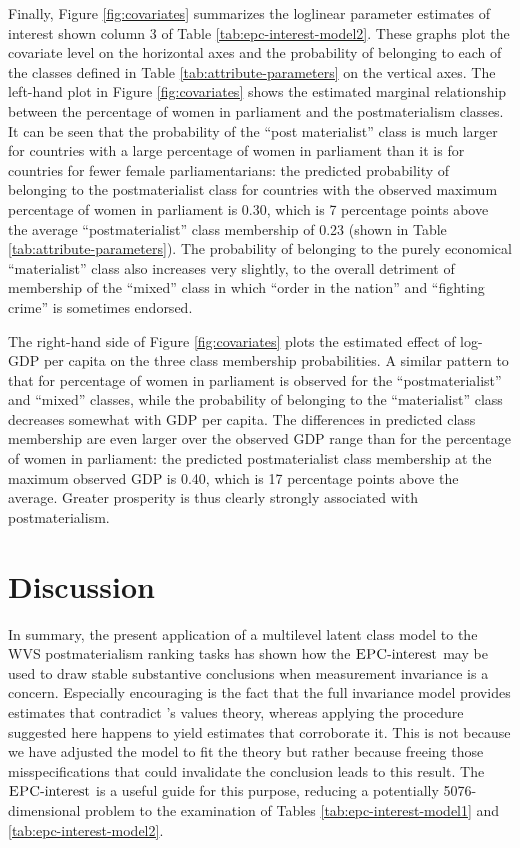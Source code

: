 \documentclass[letterpaper,12pt]{article}
\newcommand{\da}{\textrm{{\sc {EPC}}-interest}}
\begin{document}
Finally, Figure \ref{fig:covariates} summarizes the loglinear parameter estimates of interest shown column 3 of Table \ref{tab:epc-interest-model2}. These graphs plot the covariate level on the horizontal axes and the probability of belonging to each of the classes defined in Table \ref{tab:attribute-parameters} on the vertical axes. The left-hand plot in Figure \ref{fig:covariates} shows the estimated marginal relationship between the percentage of women in parliament and the postmaterialism classes. It can be seen that the probability of the ``post materialist'' class is much larger for countries with a large percentage of women in parliament than it is for countries for fewer female parliamentarians: the predicted probability of belonging to the postmaterialist class for countries with the observed maximum percentage of women in parliament is 0.30, which is 7 percentage points above the average ``postmaterialist'' class membership of 0.23 (shown in Table \ref{tab:attribute-parameters}). The probability of belonging to the purely economical ``materialist'' class also increases very slightly, to the overall detriment of membership of the ``mixed'' class in which ``order in the nation'' and ``fighting crime'' is sometimes endorsed. 

The right-hand side of Figure \ref{fig:covariates} plots the estimated effect of log-GDP per capita on the three class membership probabilities. A similar pattern to that for percentage of women in parliament is observed for the ``postmaterialist'' and ``mixed'' classes, while the probability of belonging to the ``materialist'' class decreases somewhat with GDP per capita. The differences in predicted class membership are even larger over the observed GDP range than for the percentage of women in parliament: the predicted postmaterialist class membership at the maximum observed GDP is 0.40, which is 17 percentage points above the average. Greater prosperity is thus clearly strongly associated with postmaterialism. 




\section{Discussion}


In summary, the present application of a multilevel latent class model to the WVS postmaterialism ranking tasks has shown how the $\da{}$ may be used to draw stable substantive conclusions when measurement invariance is a concern. Especially encouraging is the fact that the full invariance model provides estimates that contradict \citet{inglehart2010changing}'s values theory, whereas applying the procedure suggested here happens to yield estimates that corroborate it. This is not because we have adjusted the model to fit the theory but rather because freeing those misspecifications that could invalidate the conclusion  leads to this result. The $\da{}$ is a useful guide for this purpose, reducing a potentially 5076-dimensional problem to the examination of Tables \ref{tab:epc-interest-model1} and \ref{tab:epc-interest-model2}.
\end{document}
